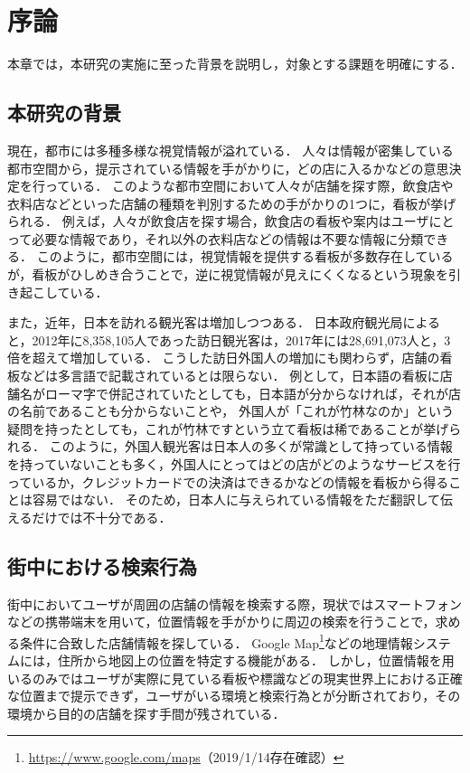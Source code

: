 \chapter{序論}
\label{chapter:introduction}

本章では，本研究の実施に至った背景を説明し，対象とする課題を明確にする．

\section{本研究の背景}
  現在，都市には多種多様な視覚情報が溢れている．
  人々は情報が密集している都市空間から，提示されている情報を手がかりに，どの店に入るかなどの意思決定を行っている．
  このような都市空間において人々が店舗を探す際，飲食店や衣料店などといった店舗の種類を判別するための手がかりの1つに，看板が挙げられる．
  例えば，人々が飲食店を探す場合，飲食店の看板や案内はユーザにとって必要な情報であり，それ以外の衣料店などの情報は不要な情報に分類できる．
  このように，都市空間には，視覚情報を提供する看板が多数存在しているが，看板がひしめき合うことで，逆に視覚情報が見えにくくなるという現象を引き起こしている\cite{Watanabe:2003}．

  また，近年，日本を訪れる観光客は増加しつつある．
  日本政府観光局によると，2012年に8,358,105人であった訪日観光客は，2017年には28,691,073人と，3倍を超えて増加している\cite{JNTO:2018}．
  こうした訪日外国人の増加にも関わらず，店舗の看板などは多言語で記載されているとは限らない．
  例として，日本語の看板に店舗名がローマ字で併記されていたとしても，日本語が分からなければ，それが店の名前であることも分からないことや，
  外国人が「これが竹林なのか」という疑問を持ったとしても，これが竹林ですという立て看板は稀であることが挙げられる．
  このように，外国人観光客は日本人の多くが常識として持っている情報を持っていないことも多く，外国人にとってはどの店がどのようなサービスを行っているか，クレジットカードでの決済はできるかなどの情報を看板から得ることは容易ではない．
  そのため，日本人に与えられている情報をただ翻訳して伝えるだけでは不十分である\cite{Hayashida:2005}．

\section{街中における検索行為}
\label{section:searching_action}
  街中においてユーザが周囲の店舗の情報を検索する際，現状ではスマートフォンなどの携帯端末を用いて，位置情報を手がかりに周辺の検索を行うことで，求める条件に合致した店舗情報を探している．
  Google Map\footnote{\url{https://www.google.com/maps}（2019/1/14存在確認）}などの地理情報システムには，住所から地図上の位置を特定する機能がある．
  しかし，位置情報を用いるのみではユーザが実際に見ている看板や標識などの現実世界上における正確な位置まで提示できず，ユーザがいる環境と検索行為とが分断されており，その環境から目的の店舗を探す手間が残されている．
  
